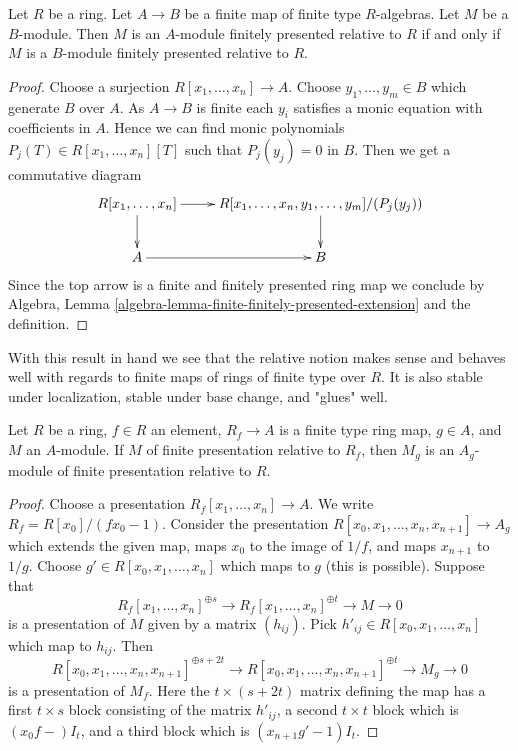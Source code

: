 \begin{lemma}
\label{lemma-finite-extension}
Let $R$ be a ring. Let $A \to B$ be a finite map of finite type $R$-algebras.
Let $M$ be a $B$-module. Then
$M$ is an $A$-module finitely presented relative to $R$
if and only if
$M$ is a $B$-module finitely presented relative to $R$.
\end{lemma}

\begin{proof}
Choose a surjection $R[x_1, \ldots, x_n] \to A$.
Choose $y_1, \ldots, y_m \in B$ which generate $B$ over $A$.
As $A \to B$ is finite each $y_i$ satisfies a monic equation with
coefficients in $A$. Hence we can find monic polynomials
$P_j(T) \in R[x_1, \ldots, x_n][T]$ such that $P_j(y_j) = 0$ in $B$.
Then we get a commutative diagram
$$
\xymatrix{
R[x_1, \ldots, x_n] \ar[d] \ar[r] &
R[x_1, \ldots, x_n, y_1, \ldots, y_m]/(P_j(y_j)) \ar[d] \\
A \ar[r] & B
}
$$
Since the top arrow is a finite and finitely presented ring map
we conclude by
Algebra, Lemma \ref{algebra-lemma-finite-finitely-presented-extension}
and the definition.
\end{proof}

\noindent
With this result in hand we see that the relative notion makes sense
and behaves well with regards to finite maps of rings of finite type
over $R$. It is also stable under localization, stable under
base change, and "glues" well.

\begin{lemma}
\label{lemma-localize-relative-finite-presentation}
Let $R$ be a ring, $f \in R$ an element, $R_f \to A$ is a finite type ring map,
$g \in A$, and $M$ an $A$-module. If $M$ of finite presentation relative
to $R_f$, then $M_g$ is an $A_g$-module of finite presentation relative
to $R$.
\end{lemma}

\begin{proof}
Choose a presentation $R_f[x_1, \ldots, x_n] \to A$. We write
$R_f = R[x_0]/(fx_0 - 1)$. Consider the presentation
$R[x_0, x_1, \ldots, x_n, x_{n + 1}] \to A_g$ which extends the given
map, maps $x_0$ to the image of $1/f$, and maps $x_{n + 1}$ to $1/g$.
Choose $g' \in R[x_0, x_1, \ldots, x_n]$ which maps to $g$ (this is
possible). Suppose that
$$
R_f[x_1, \ldots, x_n]^{\oplus s} \to
R_f[x_1, \ldots, x_n]^{\oplus t} \to M \to 0
$$
is a presentation of $M$ given by a matrix $(h_{ij})$. Pick
$h'_{ij} \in R[x_0, x_1, \ldots, x_n]$ which map to $h_{ij}$.
Then
$$
R[x_0, x_1, \ldots, x_n, x_{n + 1}]^{\oplus s + 2t} \to
R[x_0, x_1, \ldots, x_n, x_{n + 1}]^{\oplus t} \to M_g \to 0
$$
is a presentation of $M_f$.
Here the $t \times (s + 2t)$ matrix defining the map has a first
$t \times s$ block consisting of the matrix $h'_{ij}$, a second
$t \times t$ block which is $(x_0f - )I_t$, and a third block
which is $(x_{n + 1}g' - 1)I_t$.
\end{proof}

